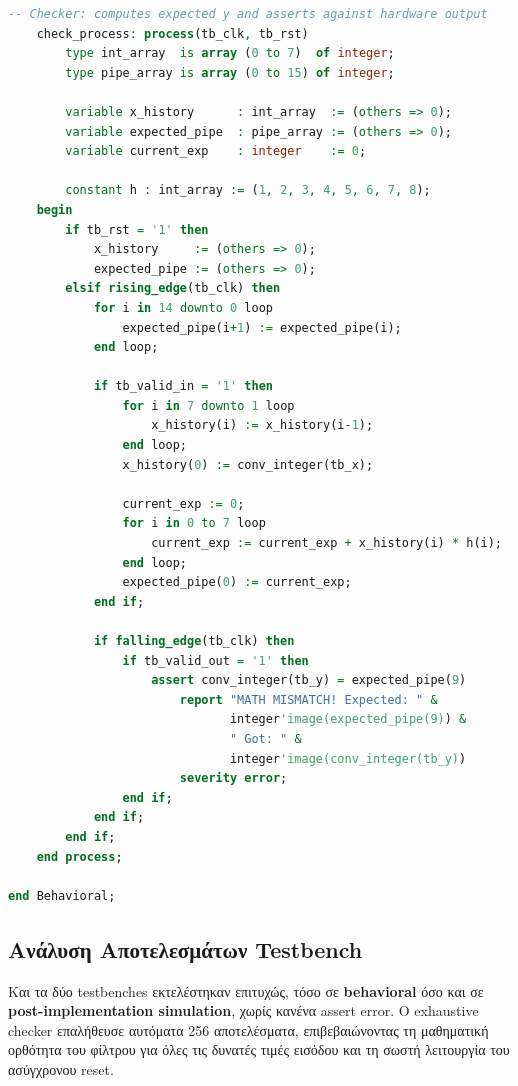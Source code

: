 \documentclass[12pt]{article}
\begin{document}
\begin{lstlisting}[language=VHDL]
    -- Checker: computes expected y and asserts against hardware output
    check_process: process(tb_clk, tb_rst)
        type int_array  is array (0 to 7)  of integer;
        type pipe_array is array (0 to 15) of integer;

        variable x_history      : int_array  := (others => 0);
        variable expected_pipe  : pipe_array := (others => 0);
        variable current_exp    : integer    := 0;

        constant h : int_array := (1, 2, 3, 4, 5, 6, 7, 8);
    begin
        if tb_rst = '1' then
            x_history     := (others => 0);
            expected_pipe := (others => 0);
        elsif rising_edge(tb_clk) then
            for i in 14 downto 0 loop
                expected_pipe(i+1) := expected_pipe(i);
            end loop;

            if tb_valid_in = '1' then
                for i in 7 downto 1 loop
                    x_history(i) := x_history(i-1);
                end loop;
                x_history(0) := conv_integer(tb_x);

                current_exp := 0;
                for i in 0 to 7 loop
                    current_exp := current_exp + x_history(i) * h(i);
                end loop;
                expected_pipe(0) := current_exp;
            end if;

            if falling_edge(tb_clk) then
                if tb_valid_out = '1' then
                    assert conv_integer(tb_y) = expected_pipe(9)
                        report "MATH MISMATCH! Expected: " &
                               integer'image(expected_pipe(9)) &
                               " Got: " &
                               integer'image(conv_integer(tb_y))
                        severity error;
                end if;
            end if;
        end if;
    end process;

end Behavioral;
\end{lstlisting}

\subsection*{Ανάλυση Αποτελεσμάτων Testbench}

Και τα δύο testbenches εκτελέστηκαν επιτυχώς, τόσο σε \textbf{behavioral} όσο και σε \textbf{post-implementation simulation}, χωρίς κανένα assert error. Ο exhaustive checker επαλήθευσε αυτόματα 256 αποτελέσματα, επιβεβαιώνοντας τη μαθηματική ορθότητα του φίλτρου για όλες τις δυνατές τιμές εισόδου και τη σωστή λειτουργία του ασύγχρονου reset.
\end{document}
